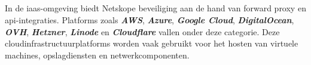     
    
    

\subsection{}
\label{subsubsec:iaas-poc}

In de \gls{iaas}-omgeving biedt Netskope beveiliging aan de hand van forward proxy en \gls{api}-integraties. 
Platforms zoals \textbf{\textit{AWS}}, \textbf{\textit{Azure}}, \textbf{\textit{Google Cloud}}, \textbf{\textit{DigitalOcean}}, \textbf{\textit{OVH}}, \textbf{\textit{Hetzner}}, \textbf{\textit{Linode}} 
en \textbf{\textit{Cloudflare}} vallen onder deze categorie. Deze cloudinfrastructuurplatforms worden vaak gebruikt voor het hosten van virtuele machines, opslagdiensten en netwerkcomponenten.





\subsection{}
\label{subsubsec:e-mail-poc}

